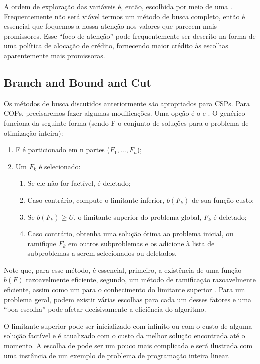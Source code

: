 \documentclass{article}
\begin{document}
A ordem de exploração das variáveis é, então, escolhida por meio de uma . Frequentemente não será viável termos um método de busca completo, então é
essencial que foquemos a nossa atenção nos valores que parecem mais promissores. Esse ``foco de
atenção'' pode frequentemente ser descrito na forma de uma política de alocação de crédito,
fornecendo maior crédito às escolhas aparentemente mais promissoras.

\subsection{Branch and Bound and Cut}

Os métodos de busca discutidos anteriormente são apropriados para CSPs. Para COPs, precisaremos
fazer algumas modificações. Uma opção é o  e . O  genérico funciona da seguinte forma (sendo F o conjunto de
soluções para o problema de otimização inteira):

\begin{enumerate}
  \item F é particionado em n partes ($F_1, \hdots, F_n$);
  \item Um $F_k$ é selecionado:
    \begin{enumerate}
      \item Se ele não for factível, é deletado;
      \item Caso contrário, compute o limitante inferior, $b(F_k)$ de sua função custo;
      \item Se $b(F_k) \geq U$, o limitante superior do problema global, $F_k$ é deletado;
      \item Caso contrário, obtenha uma solução ótima ao problema inicial, ou ramifique $F_k$ em
        outros subproblemas e os adicione à lista de subproblemas a serem selecionados ou deletados.
    \end{enumerate}
  \end{enumerate}

Note que, para esse método, é essencial, primeiro, a existência de uma função $b(F)$ razoavelmente
eficiente, segundo, um método de ramificação razoavelmente eficiente, assim como um para o
conhecimento do limitante superior . Para um problema geral, podem existir várias
escolhas para cada um desses fatores e uma ``boa escolha'' pode afetar decisivamente a eficiência
do algoritmo.

O limitante superior  pode ser inicializado com infinito ou com o custo de alguma
solução factível e é atualizado com o custo da melhor solução encontrada até o momento. A escolha de
 pode ser um pouco mais complicada e será ilustrada com uma instância de um exemplo de
problema de programação inteira linear.
\end{document}
